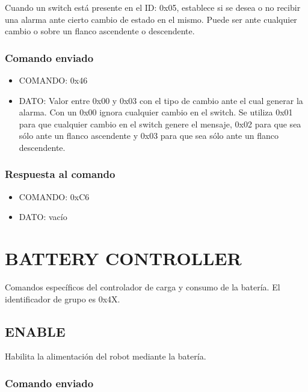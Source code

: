 \documentclass[a4paper,10pt]{article}
\begin{document}
Cuando un switch est\'a presente en el ID: 0x05, establece si se desea o no recibir una alarma ante cierto cambio de estado en el mismo.
Puede ser ante cualquier cambio o sobre un flanco ascendente o descendente.

\subsubsection*{Comando enviado}

\begin{itemize}
	\item{COMANDO:} 0x46
	\item{DATO:} Valor entre 0x00 y 0x03 con el tipo de cambio ante el cual generar la alarma.
	Con un 0x00 ignora cualquier cambio en el switch.
	Se utiliza 0x01 para que cualquier cambio en el switch genere el mensaje, 
	0x02 para que sea s\'olo ante un flanco ascendente y 0x03 para que sea s\'olo ante un flanco descendente.

\end{itemize}

\subsubsection*{Respuesta al comando}

\begin{itemize}
	\item{COMANDO:} 0xC6
	\item{DATO:} vac\'io
\end{itemize}

\section{BATTERY CONTROLLER} 
\label{grupo_battery_controller}

Comandos espec\'ificos del controlador de carga y consumo de la bater\'ia.
El identificador de grupo es 0x4X.

\subsection{ENABLE}
\label{get_battery_value}

Habilita la alimentaci\'on del robot mediante la bater\'ia.

\subsubsection*{Comando enviado}
\end{document}
